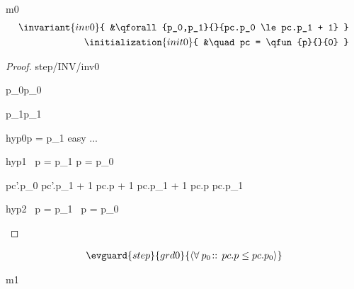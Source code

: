 \documentclass[12pt]{amsart}
\begin{document}
\begin{machine}{m0}
\begin{align*}
\invariant{inv0}
{	&\qforall{p_0,p_1}{}{pc.p_0 \le pc.p_1 + 1} } \\
\initialization{init0}
{	&\quad pc = \qfun{p}{}{0} }
\end{align*}

\begin{proof}{step/INV/inv0}
	\begin{free:var}{p_0}{p_0}
	\begin{free:var}{p_1}{p_1}
	\begin{by:cases}
		\begin{case}{hyp0}{p = p_1}
		easy ...
		\easy
		
		\end{case}
		\begin{case}{hyp1}{\neg ~ p = p_1 \land p = p_0}
\begin{calculation}
		pc'.p_0 \le pc'.p_1 + 1
		pc.p + 1 \le pc.p_1 + 1
		pc.p \le pc.p_1
	\hint{=}{ \ref{grd0} }
		\true
\end{calculation}
		\end{case}
		\begin{case}{hyp2}{\neg ~ p = p_1 \1\land \neg~p = p_0}
		\easy
		\end{case}
	\end{by:cases}
	\end{free:var}
	\end{free:var}
\end{proof}

\begin{align*}
\evguard{step}{grd0}
{	\qforall{p_0}{}{ pc.p \le pc.p_0 } }
\end{align*}


\end{machine}

\begin{machine}{m1}


\end{machine}
\end{document}
